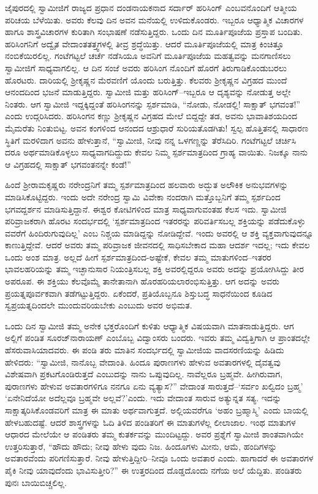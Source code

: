 ಜೈಪುರದಲ್ಲಿ ಸ್ವಾಮೀಜಿಗೆ ರಾಜ್ಯದ ಪ್ರಧಾನ ದಂಡನಾಯಕನಾದ ಸರ್ದಾರ್ ಹರಿಸಿಂಗ್ ಎಂಬವನೊಂದಿಗೆ ಆತ್ಮೀಯ ಪರಿಚಯ ಬೆಳೆಯಿತು. ಅವರು ಕೆಲವು ದಿನ ಅವನ ಮನೆಯಲ್ಲಿ ಉಳಿದುಕೊಂಡರು. ಇಬ್ಬರೂ ಆಧ್ಯಾತ್ಮಿಕ ವಿಚಾರಗಳ ಹಾಗೂ ಶಾಸ್ತ್ರವಿಚಾರಗಳ ಕುರಿತಾಗಿ ಸಂಭಾಷಣೆ ನಡೆಸುತ್ತಿದ್ದರು. ಒಂದು ದಿನ ಮೂರ್ತಿಪೂಜೆಯ ಪ್ರಸ್ತಾಪ ಬಂದಿತು. ಹರಿಸಿಂಗನಿಗೆ ಅದ್ವೈತ ವೇದಾಂತತತ್ತ್ವಗಳಲ್ಲಿ ತೀವ್ರ ಶ್ರದ್ಧೆಯಿತ್ತು. ಆದರೆ ಮೂರ್ತಿಪೂಜೆಯಲ್ಲಿ ಮಾತ್ರ ಕಿಂಚಿತ್ತೂ ನಂಬಿಕೆಯಿರಲಿಲ್ಲ. ಗಂಟೆಗಟ್ಟಲೆ ಚರ್ಚೆ ನಡೆಸಿಯೂ ಅವನಿಗೆ ಮೂರ್ತಿಪೂಜೆಯ ಮಹತ್ವವನ್ನು ಮನಗಾಣಿಸಲು ಸ್ವಾಮೀಜಿಗೆ ಸಾಧ್ಯವಾಗಲಿಲ್ಲ. ಆ ದಿನ ಸಂಜೆ ಅವರು ಹರಿಸಿಂಗ ನೊಂದಿಗೆ ಹೊರಗೆ ತಿರುಗಾಡಿಕೊಂಡುಬರಲು ಹೊರಟರು. ದಾರಿಯಲ್ಲಿ ಶ್ರೀಕೃಷ್ಣನ ಮೆರವಣಿಗೆ ಯೊಂದು ಬರುತ್ತಿತ್ತು. ಕೆಲವರು ಶ್ರೀಕೃಷ್ಣನ ವಿಗ್ರಹದ ಮುಂದೆ ಆನಂದದಿಂದ ಭಜನೆ ಮಾಡುತ್ತಿದ್ದರು. ಸ್ವಾಮೀಜಿ ಮತ್ತು ಹರಿಸಿಂಗ್​–ಇಬ್ಬರೂ ಆ ದೃಶ್ಯವನ್ನು ನೋಡುತ್ತ ಅಲ್ಲೇ ನಿಂತರು. ಆಗ ಸ್ವಾಮೀಜಿ ಇದ್ದಕ್ಕಿದ್ದಂತೆ ಹರಿಸಿಂಗನನ್ನು ಸ್ಪರ್ಶಮಾಡಿ, “ನೋಡು, ನೋಡಲ್ಲಿ! ಸಾಕ್ಷಾತ್ ಭಗವಂತ!” ಎಂದು ಉದ್ಗರಿಸಿದರು. ಹರಿಸಿಂಗನ ಕಣ್ಣು ಶ್ರೀಕೃಷ್ಣನ ವಿಗ್ರಹದ ಮೇಲೆ ಬಿದ್ದದ್ದೇ ತಡ, ಅವನು ಭಾವಾತಿಶಯದಿಂದ ಮೈಮರೆತು ನಿಂತುಬಿಟ್ಟ. ಅವನ ಕಂಗಳಿಂದ ಆನಂದದ ಆಶ್ರುಧಾರೆ ಸುರಿಯತೊಡಗಿತು! ಸ್ವಲ್ಪ ಹೊತ್ತಿತನಲ್ಲಿ ಸಾಧಾರಣ ಸ್ಥಿತಿಗೆ ಮರಳಿದಾಗ ಅವನು ಹೇಳುತ್ತಾನೆ, “ಸ್ವಾಮೀಜಿ, ನೀವು ನನ್ನ ಒಳಗಣ್ಣನ್ನು ತೆರೆಸಿದಿರಿ. ಗಂಟೆಗಟ್ಟಲೆ ಚರ್ಚಿಸಿ ದರೂ ಅರ್ಥಮಾಡಿಕೊಳ್ಳಲು ಸಾಧ್ಯವಾಗದಿದ್ದುದು ಕೇವಲ ನಿಮ್ಮ ಸ್ಪರ್ಶಮಾತ್ರದಿಂದ ಗ್ರಾಹ್ಯ ವಾಯಿತು. ನಿಜಕ್ಕೂ ನಾನು ಆ ವಿಗ್ರಹದಲ್ಲಿ ಸಾಕ್ಷಾತ್ ಭಗವಂತನನ್ನೇ ಕಂಡೆ!”

ಹಿಂದೆ ಶ್ರೀರಾಮಕೃಷ್ಣರು ನರೇಂದ್ರನಿಗೆ ತಮ್ಮ ಸ್ಪರ್ಶಮಾತ್ರದಿಂದ ಹಲವಾರು ಅದ್ಭುತ ಅಲೌಕಿಕ ಅನುಭವಗಳನ್ನು ಮಾಡಿಸಿಕೊಟ್ಟಿದ್ದರು. ಇಂದು ಅದೇ ನರೇಂದ್ರ ಸ್ವಾಮಿ ವಿವೇಕಾ ನಂದರಾಗಿ ಮತ್ತೊಬ್ಬನಿಗೆ ತಮ್ಮ ಸ್ಪರ್ಶದಿಂದ ಭಗವದ್ದರ್ಶನ ಮಾಡಿಸುತ್ತಿದ್ದಾನೆ. ಈಶ್ವರ ಕೋಟಿಗಳಿಂದ ಮಾತ್ರ ಸಾಧ್ಯವಾಗುವಂತಹ ಕೆಲಸ ಇದು. ಸ್ವಾಮೀಜಿ ಪರಿವ್ರಾಜಕರಾಗಿ ಹೊರಟ ಸಂದರ್ಭದಲ್ಲಿ ‘ಸ್ಪರ್ಶಮಾತ್ರದಿಂದ ಇತರರನ್ನು ಪರಿವರ್ತಿಸಬಲ್ಲ ಶಕ್ತಿಯನ್ನು ಪಡೆದುಕೊಳ್ಳು ವವರೆಗೆ ಹಿಂದಿರುಗುವುದಿಲ್ಲ’ ಎಂಬ ನಿಶ್ಚಯ ಮಾಡಿದ್ದನ್ನು ನೋಡಿದ್ದೇವೆ. ಇಂದು ಅವರಲ್ಲಿ ಆ ಶಕ್ತಿ ವ್ಯಕ್ತವಾಗುವುದನ್ನೂ ಕಾಣುತ್ತಿದ್ದೇವೆ. ಆದರೆ ಅವರು ತಮ್ಮ ಪರಿವ್ರಾಜಕ ಜೀವನದಲ್ಲಿ ಸಾಧಿಸಬೇಕಾದ ಮಹಾ ಆದರ್ಶ ಇದಲ್ಲ; ಇದು ಕೇವಲ ಒಂದು ಅಂಶ ಮಾತ್ರ. ಅಲ್ಲದೆ ಹೀಗೆ ಸ್ಪರ್ಶಮಾತ್ರದಿಂದ-ಅಷ್ಟೇಕೆ, ಕೇವಲ ತಮ್ಮ ಮಾತುಗಳಿಂದ–ಇತರರ ಭಾವಲಹರಿಯನ್ನು ತಮ್ಮ ಇಚ್ಛಾನುಸಾರ ನಿಯಂತ್ರಿಸಬಲ್ಲ ಶಕ್ತಿ ಅವರಲ್ಲಿದ್ದರೂ ಅವರು ಅದನ್ನು ಪ್ರಯೋಗಿಸಿದ್ದು ತೀರ ಅಪರೂಪ. ಈ ಶಕ್ತಿಯು ಕೆಲವೊಮ್ಮೆ ತಾನೇತಾನಾಗಿ ಹೊರಹರಿಯಲಾರಂಭಿಸುತ್ತಿತ್ತು. ಆಗ ಅದನ್ನು ಅವರು ಪ್ರಯತ್ನಪೂರ್ವಕವಾಗಿ ತಡೆಗಟ್ಟುತ್ತಿದ್ದರು. ಏಕೆಂದರೆ, ಪ್ರತಿಯೊಬ್ಬನೂ ಶಿಸ್ತುಬದ್ಧ ಸಾಧನೆಯಿಂದ ಕೂಡಿದ ಸ್ವಪ್ರಯತ್ನದಿಂದಲೇ ಮುಂದುವರಿಯಬೇಕು ಎಂಬುದು ಅವರ ಅಭಿಮತ.

ಒಂದು ದಿನ ಸ್ವಾಮೀಜಿ ತಮ್ಮ ಅನೇಕ ಭಕ್ತರೊಂದಿಗೆ ಕುಳಿತು ಆಧ್ಯಾತ್ಮಿಕ ವಿಷಯವಾಗಿ ಮಾತನಾಡುತ್ತಿದ್ದರು. ಆಗ ಅಲ್ಲಿಗೆ ಪಂಡಿತ ಸೂರಜ್​ನಾರಾಯಣ್ ಎಂಬೊಬ್ಬ ವಿದ್ವಾಂಸರು ಬಂದರು. ಇವರು ತಮ್ಮ ವಿದ್ವತ್ತಿಗಾಗಿ ಆ ಪ್ರಾಂತದಲ್ಲೇ ಹೆಸರುವಾಸಿಯಾದವರು. ಈ ಪಂಡಿ ತರು ಮಾತಿನ ಸಂದರ್ಭದಲ್ಲಿ ಸ್ವಾಮೀಜಿಯ ವಾದಸರಣಿಯನ್ನು ಹಿಡಿದು ಹೇಳಿದರು: “ಸ್ವಾಮೀಜಿ, ನಾನೊಬ್ಬ ವೇದಾಂತಿ. ಹಿಂದೂ ಪುರಾಣಗಳು ಹೇಳುವ ಅವತಾರಗಳಲ್ಲಿ ದೈವತ್ವವು ವಿಶೇಷವಾಗಿ ಪ್ರಕಟಗೊಂಡಿರುತ್ತದೆ ಎಂಬುದನ್ನು ನಾನು ಒಪ್ಪುವುದಿಲ್ಲ. ನಾವೆಲ್ಲರೂ ಬ್ರಹ್ಮವೇ. ಹೀಗಿರುವಾಗ, ಪುರಾಣಗಳು ಹೇಳುವ ಅವತಾರಗಳಿಗೂ ನನಗೂ ಏನು ವ್ಯತ್ಯಾಸ?” ವೇದಾಂತ ಸಾರುತ್ತದೆ–‘ಸರ್ವಂ ಖಲ್ವಿದಂ ಬ್ರಹ್ಮ’ ‘ಏನೇನಿದೆಯೋ ಅದೆಲ್ಲವೂ ಬ್ರಹ್ಮವೇ ಅಲ್ಲವೆ?’ಎಂದು. ಇದು ವೇದಾಂತ ಸಾರುವ ಅತ್ಯುನ್ನತ ಸತ್ಯ. ಇದನ್ನು ಸಾಕ್ಷಾತ್ಕರಿಸಿಕೊಂಡವರಿಗೆ ಮಾತ್ರ ಈ ಮಾತು ಅರ್ಥವಾಗುತ್ತದೆ. ಅಲ್ಲಿಯವರೆಗೂ ‘ಅಹಂ ಬ್ರಹ್ಮಾಸ್ಮಿ’ ಎಂದು ಬಾಯಲ್ಲಿ ಹೇಳಬಹುದಷ್ಟೆ. ಆದರೆ ಶಾಸ್ತ್ರಗಳನ್ನು ಓದಿ ತಿಳಿದ ಪಂಡಿತರಿಗೆ ಈ ಮಾತುಗಳೆಲ್ಲ ಲೀಲಾಜಾಲ. ಇಂಥ ಮಾತುಗಳ ಆಧಾರದ ಮೇಲೆಯೇ ಆ ಪಂಡಿತರು ತಮ್ಮ ಕುತರ್ಕವನ್ನು ಮುಂದಿಟ್ಟದ್ದು. ಅವರ ಪ್ರಶ್ನೆಗೆ ಸ್ವಾಮೀಜಿ ಶಾಂತವಾಗಿಯೇ ಉತ್ತರಿಸುತ್ತಾರೆ, “ಹೌದು ಹೌದು; ನೀವು ಹೇಳು ವುದು ನಿಜ. ಹಿಂದೂಗಳು ಮೀನು, ಆಮೆ, ಹಂದಿಗಳನ್ನು ಅವತಾರವೆಂದು ಪರಿಗಣಿಸುತ್ತಾರೆ. ನೀವು ಹೇಳುತ್ತಿದ್ದೀರಿ–ನೀವೂ ಒಂದು ಅವತಾರ ಎಂದು. ಹಾಗಾದರೆ ಈ ಅವತಾರಗಳ ಪೈಕಿ ನೀವು ಯಾವುದೆಂದು ಭಾವಿಸುತ್ತೀರಿ?” ಈ ಉತ್ತರದಿಂದ ದೊಡ್ಡದೊಂದು ನಗೆಯ ಅಲೆ ಯೆದ್ದಿತು. ಪಂಡಿತರು ಪುನಃ ಬಾಯಿಬಿಚ್ಚಲಿಲ್ಲ.

